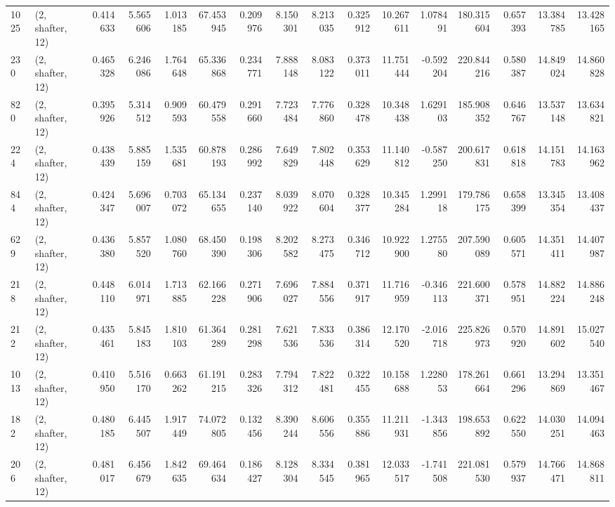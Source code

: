 \begin{tabular}{llrrrrrrrrrrrrrr}
1025 &  (2, shafter, 12) &   0.414633 &   5.565606 &   1.013185 &     67.453945 &    0.209976 &    8.150301 &    8.213035 &  0.325912 &  10.267611 &   1.078491 &   180.315604 &   0.657393 &  13.384785 &  13.428165 \\
230  &  (2, shafter, 12) &   0.465328 &   6.246086 &   1.764648 &     65.336868 &    0.234771 &    7.888148 &    8.083122 &  0.373011 &  11.751444 &  -0.592204 &   220.844216 &   0.580387 &  14.849024 &  14.860828 \\
820  &  (2, shafter, 12) &   0.395926 &   5.314512 &   0.909593 &     60.479558 &    0.291660 &    7.723484 &    7.776860 &  0.328478 &  10.348438 &   1.629103 &   185.908352 &   0.646767 &  13.537148 &  13.634821 \\
224  &  (2, shafter, 12) &   0.438439 &   5.885159 &   1.535681 &     60.878193 &    0.286992 &    7.649829 &    7.802448 &  0.353629 &  11.140812 &  -0.587250 &   200.617831 &   0.618818 &  14.151783 &  14.163962 \\
844  &  (2, shafter, 12) &   0.424347 &   5.696007 &   0.703072 &     65.134655 &    0.237140 &    8.039922 &    8.070604 &  0.328377 &  10.345284 &   1.299118 &   179.786175 &   0.658399 &  13.345354 &  13.408437 \\
629  &  (2, shafter, 12) &   0.436380 &   5.857520 &   1.080760 &     68.450390 &    0.198306 &    8.202582 &    8.273475 &  0.346712 &  10.922900 &   1.275580 &   207.590089 &   0.605571 &  14.351411 &  14.407987 \\
218  &  (2, shafter, 12) &   0.448110 &   6.014971 &   1.713885 &     62.166228 &    0.271906 &    7.696027 &    7.884556 &  0.371917 &  11.716959 &  -0.346113 &   221.600371 &   0.578951 &  14.882224 &  14.886248 \\
212  &  (2, shafter, 12) &   0.435461 &   5.845183 &   1.810103 &     61.364289 &    0.281298 &    7.621536 &    7.833536 &  0.386314 &  12.170520 &  -2.016718 &   225.826973 &   0.570920 &  14.891602 &  15.027540 \\
1013 &  (2, shafter, 12) &   0.410950 &   5.516170 &   0.663262 &     61.191215 &    0.283326 &    7.794312 &    7.822481 &  0.322455 &  10.158688 &   1.228053 &   178.261664 &   0.661296 &  13.294869 &  13.351467 \\
182  &  (2, shafter, 12) &   0.480185 &   6.445507 &   1.917449 &     74.072805 &    0.132456 &    8.390244 &    8.606556 &  0.355886 &  11.211931 &  -1.343856 &   198.653892 &   0.622550 &  14.030251 &  14.094463 \\
206  &  (2, shafter, 12) &   0.481017 &   6.456679 &   1.842635 &     69.464634 &    0.186427 &    8.128304 &    8.334545 &  0.381965 &  12.033517 &  -1.741508 &   221.081530 &   0.579937 &  14.766471 &  14.868811 \\

\end{tabular}
